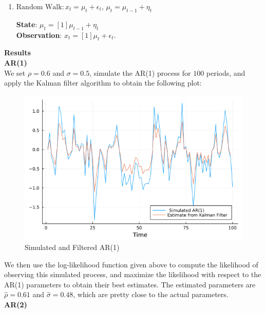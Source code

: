 \documentclass{article}
\begin{document}
\begin{enumerate}
		\item $\text{Random Walk}: x_{t} = \mu_{t} + \epsilon_{t}$, $\mu_{t} = \mu_{t-1} + \eta_{t}$

			\textbf{State}: \hspace{4mm} $\mu_t = [1]\mu_{t-1} + \eta_t$ \\
			\textbf{Observation}: $x_t = [1]\mu_t + \epsilon_t.$

	\end{enumerate}
	
	\newpage
	
	\noindent\textbf{\Large Results} \\
	
	\noindent\textbf{\large AR(1)} \\
	
	We set $\rho = 0.6$ and $\sigma = 0.5$, simulate the AR(1) process for $100$ periods, and apply the Kalman filter algorithm to obtain the following plot:
	
	\begin{figure}[htbp]
		\centering
		\includegraphics[scale=0.5]{AR1.png}
		\caption{Simulated and Filtered AR(1)}
	\end{figure} 
	
	We then use the log-likelihood function given above to compute the likelihood of observing this simulated process, and maximize the likelihood with respect to the AR(1) parameters to obtain their best estimates. The estimated parameters are $\hat{\rho} = 0.61$ and $\hat{\sigma} = 0.48$, which are pretty close to the actual parameters. \\
	
	\noindent\textbf{\large AR(2)} \\
	
\end{document}
